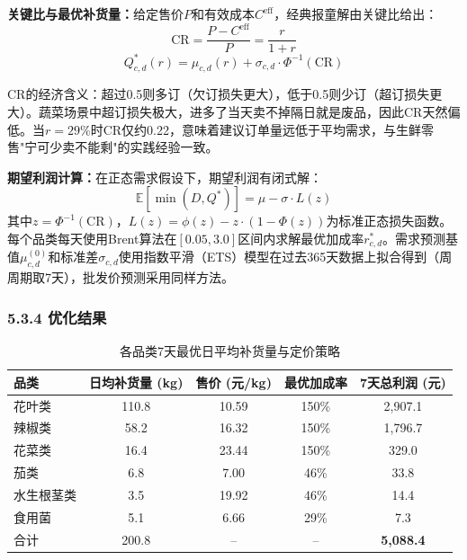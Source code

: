 \documentclass[12pt,a4paper]{article}
\begin{document}
\textbf{关键比与最优补货量：}给定售价$P$和有效成本$C^{\text{eff}}$，经典报童解由关键比给出：
\begin{equation}
\text{CR} = \frac{P - C^{\text{eff}}}{P} = \frac{r}{1 + r}
\end{equation}
\begin{equation}
Q_{c,d}^*(r) = \mu_{c,d}(r) + \sigma_{c,d} \cdot \Phi^{-1}(\text{CR})
\end{equation}

CR的经济含义：超过0.5则多订（欠订损失更大），低于0.5则少订（超订损失更大）。蔬菜场景中超订损失极大，进多了当天卖不掉隔日就是废品，因此CR天然偏低。当$r=29\%$时CR仅约0.22，意味着建议订单量远低于平均需求，与生鲜零售"宁可少卖不能剩"的实践经验一致。

\textbf{期望利润计算：}在正态需求假设下，期望利润有闭式解：
\begin{equation}
\mathbb{E}[\min(D, Q^*)] = \mu - \sigma \cdot L(z)
\end{equation}
其中$z = \Phi^{-1}(\text{CR})$，$L(z) = \phi(z) - z \cdot (1 - \Phi(z))$为标准正态损失函数。每个品类每天使用Brent算法在$[0.05, 3.0]$区间内求解最优加成率$r_{c,d}^*$。需求预测基值$\mu_{c,d}^{(0)}$和标准差$\sigma_{c,d}$使用指数平滑（ETS）模型在过去365天数据上拟合得到（周周期取7天），批发价预测采用同样方法。

\subsubsection{5.3.4 优化结果}

\begin{table}[H]
\centering
\caption{各品类7天最优日平均补货量与定价策略}
\begin{tabular}{lcccc}
\toprule
品类 & 日均补货量 (kg) & 售价 (元/kg) & 最优加成率 & 7天总利润 (元) \\
\midrule
花叶类 & 110.8 & 10.59 & 150\% & 2,907.1 \\
辣椒类 & 58.2 & 16.32 & 150\% & 1,796.7 \\
花菜类 & 16.4 & 23.44 & 150\% & 329.0 \\
茄类 & 6.8 & 7.00 & 46\% & 33.8 \\
水生根茎类 & 3.5 & 19.92 & 46\% & 14.4 \\
食用菌 & 5.1 & 6.66 & 29\% & 7.3 \\
\midrule
合计 & 200.8 & -- & -- & \textbf{5,088.4} \\
\bottomrule
\end{tabular}
\end{table}
\end{document}
